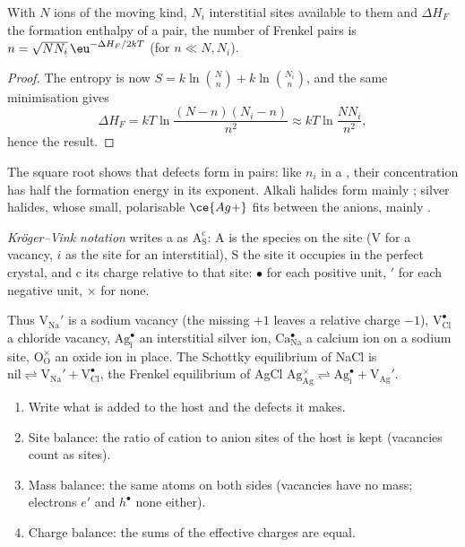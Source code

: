 \begin{proposition}\label{prop:b3:solid-state:frenkel}
With $N$ ions of the moving kind, $N_i$ interstitial sites available to them and
$\Delta H_F$ the formation enthalpy of a pair, the number of Frenkel pairs is $n =
\sqrt{NN_i}\,\eu^{-\Delta H_F/2kT}$ (for $n \ll N, N_i$).
\end{proposition}

\begin{proof}
The entropy is now $S = k\ln\binom{N}{n} + k\ln\binom{N_i}{n}$, and the same minimisation gives
\[
  \Delta H_F = kT\ln\frac{(N - n)(N_i - n)}{n^2} \approx kT\ln\frac{NN_i}{n^2},
\]
hence the result.
\end{proof}

The square root shows that defects form in pairs: like $n_i$ in a ,
their concentration has half the formation energy in its exponent. Alkali
halides form mainly ; silver halides, whose small, polarisable
$\ce{Ag+}$ fits between the anions, mainly .

\begin{definition}\label{def:b3:solid-state:kroger-vink}
\emph{Kröger--Vink notation} writes a 
as $\mathrm{A_S^c}$: A is the species on the site (V for a vacancy, $i$ as the site
for an interstitial), S the site it occupies in the perfect crystal, and c its
charge relative to that site: $\bullet$ for each positive unit, $'$ for each negative
unit, $\times$ for none.
\end{definition}

Thus $\mathrm{V_{Na}'}$ is a sodium vacancy (the missing $+1$ leaves a relative charge $-1$),
$\mathrm{V_{Cl}^{\bullet}}$ a chloride vacancy, $\mathrm{Ag_i^{\bullet}}$ an interstitial silver ion, $\mathrm{Ca_{Na}^{\bullet}}$ a calcium ion on a
sodium site, $\mathrm{O_O^{\times}}$ an oxide ion in place. The Schottky equilibrium of NaCl is
$\text{nil} \rightleftharpoons \mathrm{V_{Na}' + V_{Cl}^{\bullet}}$, the Frenkel equilibrium of AgCl
$\mathrm{Ag_{Ag}^{\times}} \rightleftharpoons \mathrm{Ag_i^{\bullet} + V_{Ag}'}$.

\begin{method}\label{met:b3:solid-state:kroger-vink}
\begin{enumerate}
  \item Write what is added to the host and the defects it makes.
  \item Site balance: the ratio of cation to anion sites of the host is kept
        (vacancies count as sites).
  \item Mass balance: the same atoms on both sides (vacancies have no mass;
        electrons $e'$ and  $h^\bullet$ none either).
  \item Charge balance: the sums of the effective charges are equal.
\end{enumerate}
\end{method}

